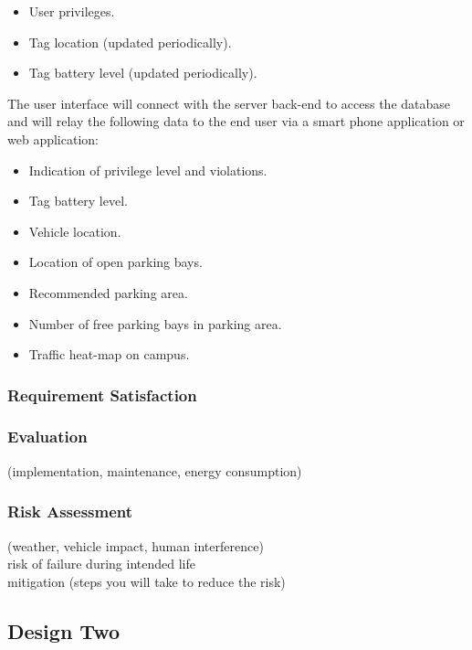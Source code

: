 \begin{itemize}
\item User privileges.
\item Tag location (updated periodically).
\item Tag battery level (updated periodically).
\end{itemize}

The user interface will connect with the server back-end to access the database and will relay the following data to the end user via a smart phone application or web application: 
\begin{itemize}
\item Indication of privilege level and violations.
\item Tag battery level.
\item Vehicle location.
\item Location of open parking bays.
\item Recommended parking area.
\item Number of free parking bays in parking area.
\item Traffic heat-map on campus.
\end{itemize}

\subsubsection{Requirement Satisfaction}

\subsubsection{Evaluation}
(implementation, maintenance, energy consumption) \\

\subsubsection{Risk Assessment}
(weather, vehicle impact, human interference) \\
risk of failure during intended life \\
mitigation (steps you will take to reduce the risk) \\

\subsection{Design Two}
